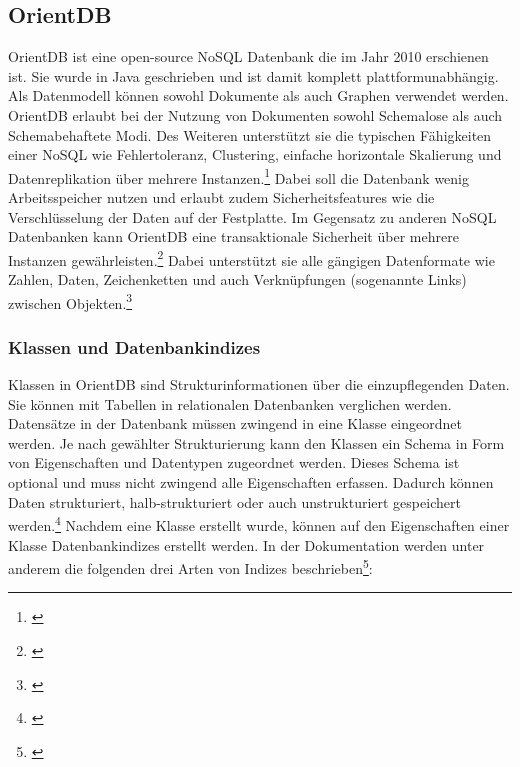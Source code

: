 
\subsection{OrientDB}


OrientDB ist eine open-source NoSQL Datenbank die im Jahr 2010 erschienen ist. Sie wurde in Java geschrieben und ist damit komplett plattformunabhängig. Als Datenmodell können sowohl Dokumente als auch Graphen verwendet werden. OrientDB erlaubt bei der Nutzung von Dokumenten sowohl Schemalose als auch Schemabehaftete Modi. Des Weiteren unterstützt sie die typischen Fähigkeiten einer NoSQL wie Fehlertoleranz, Clustering, einfache horizontale Skalierung und Datenreplikation über mehrere Instanzen.\footnote{\cite[Vgl.][]{OrientDBGettingStarted}} Dabei soll die Datenbank wenig Arbeitsspeicher nutzen und erlaubt zudem Sicherheitsfeatures wie die Verschlüsselung der Daten auf der Festplatte. Im Gegensatz zu anderen NoSQL Datenbanken kann OrientDB eine transaktionale Sicherheit über mehrere Instanzen gewährleisten.\footnote{\cite[Vgl.][]{OrientDBTransactions}} Dabei unterstützt sie alle gängigen Datenformate wie Zahlen, Daten, Zeichenketten und auch Verknüpfungen (sogenannte Links) zwischen Objekten.\footnote{\cite[Vgl.][]{OrientDBTypes}}

\subsubsection{Klassen und Datenbankindizes}

Klassen in OrientDB sind Strukturinformationen über die einzupflegenden Daten. Sie können mit Tabellen in relationalen Datenbanken verglichen werden. Datensätze in der Datenbank müssen zwingend in eine Klasse eingeordnet werden. Je nach gewählter Strukturierung kann den Klassen ein Schema in Form von Eigenschaften und Datentypen zugeordnet werden. Dieses Schema ist optional und muss nicht zwingend alle Eigenschaften erfassen. Dadurch können Daten strukturiert, halb-strukturiert oder auch unstrukturiert gespeichert werden.\footnote{\cite[Vgl.][]{OrientDBClasses}} Nachdem eine Klasse erstellt wurde, können auf den Eigenschaften einer Klasse Datenbankindizes erstellt werden. In der Dokumentation werden unter anderem die folgenden drei Arten von Indizes beschrieben\footnote{\cite[Vgl.][]{OrientDBIndexes}}:

